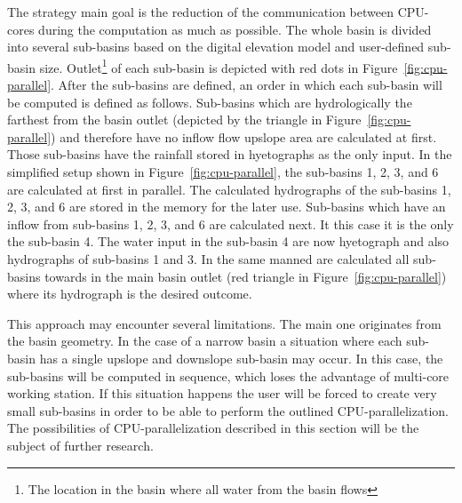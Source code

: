 The strategy main goal is the reduction of
the communication between CPU-cores during the computation as much as
possible. The whole basin is divided into several sub-basins based on
the digital elevation model and user-defined sub-basin size. 
Outlet\footnote{The location in the basin where all water from the basin flows} 
of each sub-basin is depicted with
red dots in Figure~\ref{fig:cpu-parallel}. After the sub-basins
are defined, an order in which each sub-basin will be computed is defined as
follows. Sub-basins which are hydrologically the farthest from the
basin outlet (depicted by the triangle in Figure~\ref{fig:cpu-parallel}) 
and therefore have no inflow flow upslope area are
calculated at first. Those sub-basins have the rainfall stored in
hyetographs as the only input. In the simplified setup shown in
Figure~\ref{fig:cpu-parallel}, the sub-basins 1, 2, 3, and 6 are
calculated at first in parallel. The calculated hydrographs of the
sub-basins 1, 2, 3, and 6 are stored in the memory for the later use. 
Sub-basins which
have an inflow from sub-basins 1, 2, 3, and 6 are calculated next. It
this case it is the only the sub-basin 4. The water input in
the sub-basin 4 are now hyetograph and also hydrographs of
sub-basins 1 and 3. In the same manned are
calculated all sub-basins towards in the main basin outlet (red triangle in Figure~\ref{fig:cpu-parallel}) 
where its hydrograph is the desired outcome.

This approach may encounter several limitations. The main one 
originates from the basin geometry. In the case of a narrow  basin a situation 
where each sub-basin has a single upslope and downslope sub-basin may occur.
In this case, the sub-basins will be computed in sequence, which
loses the advantage of multi-core working station. If this situation happens
the user will be forced to create very small sub-basins in order to be able 
to perform the outlined CPU-parallelization. The possibilities of CPU-parallelization
described in this section will be the subject of further research.




